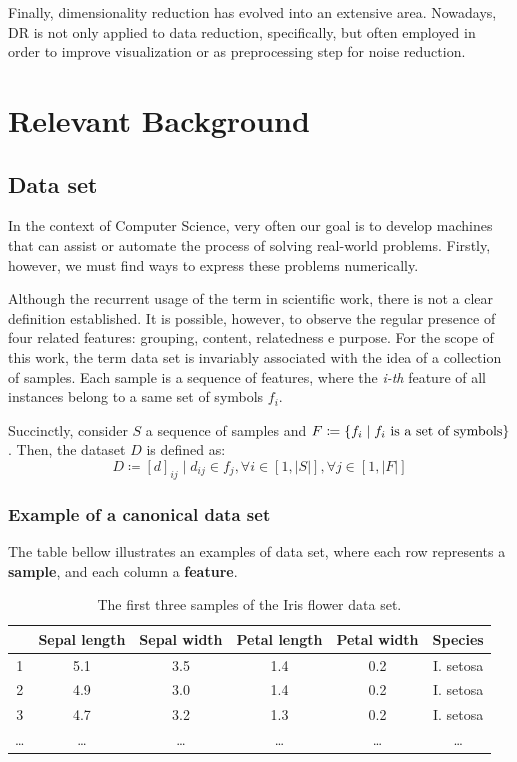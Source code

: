 \documentclass[12pt]{article}
\begin{document}
Finally, dimensionality reduction has evolved into an extensive area. Nowadays, DR is not only applied to data reduction, specifically, but often employed in order to improve visualization or as preprocessing step for noise reduction.

\newpage

\section{Relevant Background}
\subsection{Data set}

In the context of Computer Science, very often our goal is to develop machines that can assist or automate the process of solving real-world problems. Firstly, however, we must find ways to express these problems numerically.

Although the recurrent usage of the term in scientific work, there is not a clear definition established. It is possible, however, to observe the regular presence of four related features: grouping, content, relatedness e purpose. \cite{ren2010}
For the scope of this work, the term data set is invariably associated with the idea of a collection of samples. Each sample is a sequence of features, where the {\em i-th} feature of all instances belong to a same set of symbols $f_i$.

Succinctly, consider $S$ a sequence of samples and
$F \coloneqq  \{f_i \mid f_i \textnormal{ is a set of symbols}\}$. Then, the dataset $D$ is defined as:
$$D\coloneqq [d]_{ij} \mid d_{ij} \in f_j, \forall i \in [1, |S|], \forall j \in [1, |F|]$$

\subsubsection{Example of a canonical data set} \label{irisdataset}

The table bellow illustrates an examples of data set, where each row represents a \textbf{sample}, and each column a \textbf{feature}.

\begin{table}[H]
	\begin{tabular}{ c || *{5}{c|}}
		& \textbf{Sepal length} & \textbf{Sepal width} & \textbf{Petal length} & \textbf{Petal width} & \textbf{Species} \\
		\hline
		1 & 5.1	& 3.5 & 1.4 & 0.2 & I. setosa \\
		2 & 4.9 & 3.0 & 1.4 & 0.2 & I. setosa \\
		3 & 4.7 & 3.2 & 1.3 & 0.2 & I. setosa \\
		… & … & … & … & … & … \\
	\end{tabular}
	\caption{The first three samples of the Iris flower data set.}
\end{table}
\end{document}
